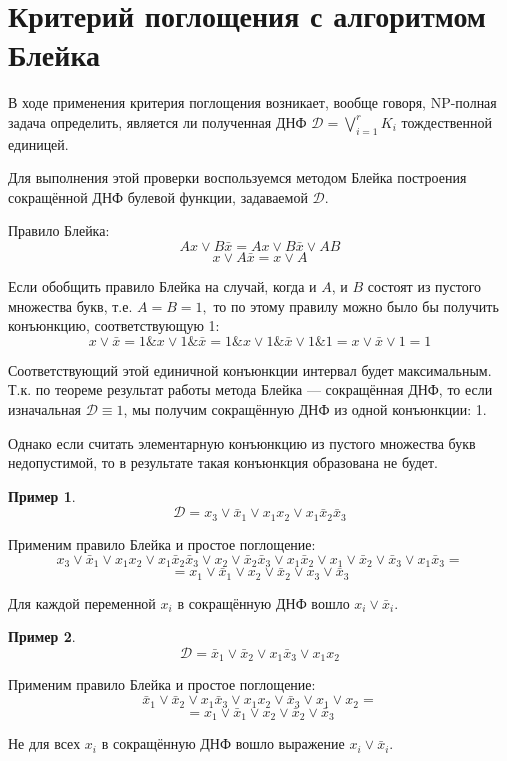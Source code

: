 \documentclass[12pt,a4paper,oneside,fleqn,leqno]{article}
\theoremstyle{definition}
\newtheorem{example}{Пример}%
\begin{document}
	\section{Критерий поглощения с алгоритмом Блейка}
		В ходе применения критерия поглощения возникает, вообще говоря, NP-полная задача определить, является ли полученная ДНФ $\mathcal{D} = \bigvee\limits_{i = 1}^rK_i$ тождественной единицей.\par
		Для выполнения этой проверки воспользуемся методом Блейка построения сокращённой ДНФ булевой функции, задаваемой $\mathcal{D}.$\par
		Правило Блейка:
		$$
			Ax \vee B\bar{x} = Ax \vee B\bar{x} \vee AB
		$$
		$$
			x \vee A\bar{x} = x \vee A
		$$\par
		Если обобщить правило Блейка на случай, когда и $A$, и $B$ состоят из пустого множества букв, т.е. $A = B = 1,$ то по этому правилу можно было бы получить конъюнкцию, соответствующую 1:
		$$
			x \vee \bar{x} = 1\& x \vee 1\&\bar{x} = 1 \& x \vee 1\&\bar{x} \vee 1 \& 1 = x \vee \bar{x} \vee 1 = 1
		$$\par
		Соответствующий этой единичной конъюнкции интервал будет максимальным. Т.к. по теореме результат работы метода Блейка --- сокращённая ДНФ, то если изначальная $\mathcal{D} \equiv 1$, мы получим сокращённую ДНФ из одной конъюнкции: 1.\par
		Однако если считать элементарную конъюнкцию из пустого множества букв недопустимой, то в результате такая конъюнкция образована не будет.
		\begin{example}
			$$
				\mathcal{D} = x_3 \vee \bar{x}_1 \vee x_1x_2 \vee x_1\bar{x}_2\bar{x}_3
			$$\par
			Применим правило Блейка и простое поглощение:
			$$
				x_3 \vee \bar{x}_1 \vee x_1x_2 \vee x_1\bar{x}_2\bar{x}_3 \vee x_2 \vee \bar{x}_2\bar{x}_3 \vee x_1\bar{x}_2 \vee x_1 \vee \bar{x}_2 \vee \bar{x}_3 \vee x_1\bar{x}_3 =
			$$
			$$
				= x_1 \vee \bar{x}_1 \vee x_2 \vee \bar{x}_2 \vee x_3 \vee \bar{x}_3
			$$\par
			Для каждой переменной $x_i$ в сокращённую ДНФ вошло $x_i \vee \bar{x}_i.$
		\end{example}
		\begin{example}
			$$
				\mathcal{D} = \bar{x}_1 \vee \bar{x}_2 \vee x_1\bar{x}_3 \vee x_1x_2
			$$\par
			Применим правило Блейка и простое поглощение:
			$$
				\bar{x}_1 \vee \bar{x}_2 \vee x_1\bar{x}_3 \vee x_1x_2 \vee \bar{x}_3 \vee x_1 \vee x_2 =
			$$
			$$
				= x_1 \vee \bar{x}_1  \vee x_2 \vee \bar{x}_2 \vee \bar{x}_3
			$$\par
			Не для всех $x_i$ в сокращённую ДНФ вошло выражение $x_i \vee \bar{x}_i.$
		\end{example}
\end{document}
